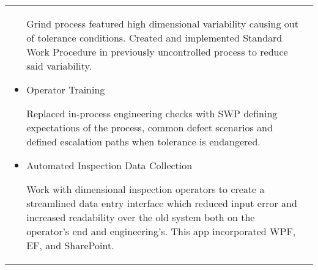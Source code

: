 \documentclass[a4paper, oneside, final, 10pt]{scrartcl} %
\begin{document}
\begin{center}
\begin{tabularx}{0.97\linewidth}{X|X}
\begin{itemize}
        \begin{sloppypar}
            Grind process featured high dimensional variability causing out of tolerance conditions.
            Created and implemented Standard Work Procedure in previously uncontrolled process to reduce said variability.
        \end{sloppypar}
        \item{Operator Training}
        \begin{sloppypar}
            Replaced in-process engineering checks with SWP defining expectations of the process, common defect scenarios
            and defined escalation paths when tolerance is endangered.
        \end{sloppypar}
        \item {Automated Inspection Data Collection}
        \begin{sloppypar}
            Work with dimensional inspection operators to create a streamlined data entry interface which reduced
            input error and increased readability over the old system both on the operator's end and engineering's. This
            app incorporated WPF, EF, and SharePoint.
        \end{sloppypar}
    \end{itemize}
\end{tabularx}





\end{center}
\end{document}
